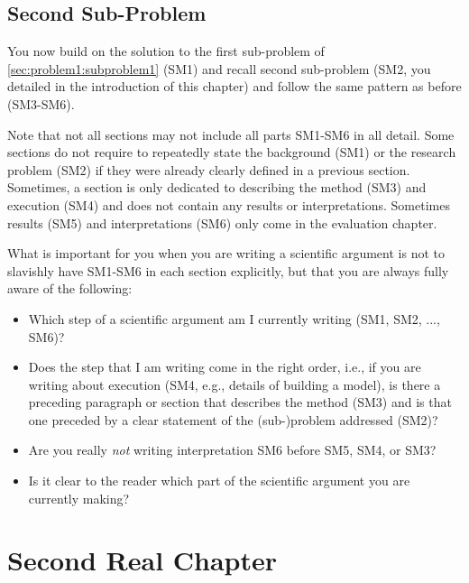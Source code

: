 \documentclass[
  fontsize=10pt
  numbers=noenddot,
  english,  %
  paper=a5,
  twoside,  %
  DIV=calc,
  headings=small,
  bibliography=totoc,
  listof=totoc,
  draft=false
]{scrbook}
\theoremstyle{break}
\begin{document}
\section{Second Sub-Problem}\label{sec:problem1:subproblem2}

You now build on the solution to the first sub-problem of \cref{sec:problem1:subproblem1} (SM1) and recall second sub-problem (SM2, you detailed in the introduction of this chapter) and follow the same pattern as before (SM3-SM6).

Note that not all sections may not include all parts SM1-SM6 in all detail. Some sections do not require to repeatedly state the background (SM1) or the research problem (SM2) if they were already clearly defined in a previous section. Sometimes, a section is only dedicated to describing the method (SM3) and execution (SM4) and does not contain any results or interpretations. Sometimes results (SM5) and interpretations (SM6) only come in the evaluation chapter.

What is important for you when you are writing a scientific argument is not to slavishly have SM1-SM6 in each section explicitly, but that you are always fully aware of the following:
%
\begin{itemize}
    \item Which step of a scientific argument am I currently writing (SM1, SM2, ..., SM6)?
    \item Does the step that I am writing come in the right order, i.e., if you are writing about execution (SM4, e.g., details of building a model), is there a preceding paragraph or section that describes the method (SM3) and is that one preceded by a clear statement of the (sub-)problem addressed (SM2)?
    \item Are you really \emph{not} writing interpretation SM6 before SM5, SM4, or SM3?
    \item Is it clear to the reader which part of the scientific argument you are currently making?
\end{itemize}

\chapter{Second Real Chapter}\label{sec:sub-problem2}
\end{document}
